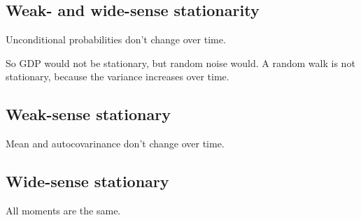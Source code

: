 
\subsection{Weak- and wide-sense stationarity}

Unconditional probabilities don't change over time.

So GDP would not be stationary, but random noise would. A random walk is not stationary, because the variance increases over time.

\subsection{Weak-sense stationary}

Mean and autocovarinance don't change over time.

\subsection{Wide-sense stationary}

All moments are the same.

